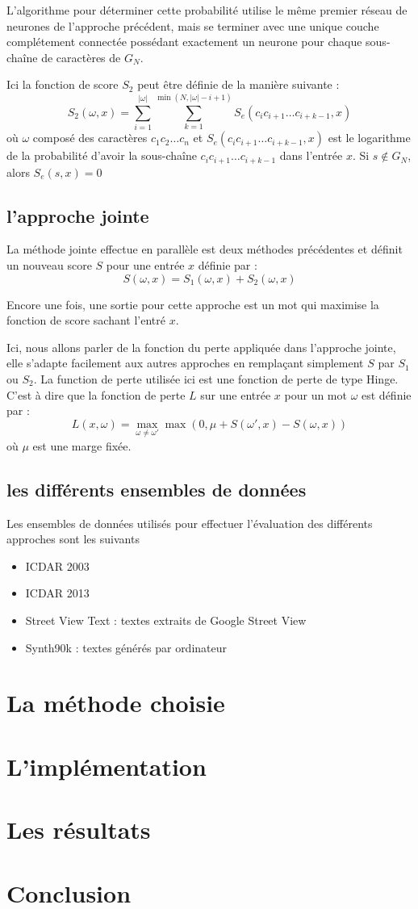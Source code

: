 \documentclass{article}
\begin{document}
L'algorithme pour déterminer cette probabilité utilise le même premier réseau de neurones de l'approche précédent, mais se terminer avec une unique couche complétement connectée possédant exactement un neurone pour chaque sous-chaîne de caractères de $G_N$. 

Ici la fonction de score $S_2$ peut être définie de la manière suivante :
$$S_2(\omega,x) = \sum_{i=1}^{|\omega|} \sum_{k=1}^{\min(N,|\omega| -i +1)} S_e(c_ic_{i+1}\dots c_{i+k-1},x)$$
où $\omega$ composé des caractères $c_1c_2\dots c_n$ et $S_e(c_ic_{i+1}\dots c_{i+k-1},x)$ est le logarithme de la probabilité d'avoir la sous-chaîne $c_ic_{i+1}\dots c_{i+k-1}$ dans l'entrée $x$. Si $s \notin G_N$, alors $S_e(s,x) = 0$

\subsection{l'approche jointe}
La méthode jointe effectue en parallèle est deux méthodes précédentes et définit un nouveau score $S$ pour une entrée $x$ définie par :
$$ S(\omega,x) = S_1(\omega,x) + S_2(\omega,x)$$

Encore une fois, une sortie pour cette approche est un mot qui maximise la fonction de score sachant l'entré $x$.

Ici, nous allons parler de la fonction du perte appliquée dans l'approche jointe, elle s'adapte facilement aux autres approches en remplaçant simplement $S$ par $S_1$ ou $S_2$. La function de perte utilisée ici est une fonction de perte de type Hinge. C'est à dire que la fonction de perte $L$ sur une entrée $x$ pour un mot $\omega$ est définie par :
$$ L(x,\omega) = \max_{\omega \neq \omega' } \max(0,\mu+ S(\omega',x) - S(\omega,x))$$
où $\mu$ est une marge fixée.

\subsection{les différents ensembles de données}

Les ensembles de données utilisés pour effectuer l'évaluation des différents approches sont les suivants
\begin{itemize}
\item ICDAR 2003
\item ICDAR 2013
\item Street View Text : textes extraits de Google Street View
\item Synth90k : textes générés par ordinateur
\end{itemize}


\section{La méthode choisie}

\section{L'implémentation}

\section{Les résultats}

\section{Conclusion}
\end{document}
